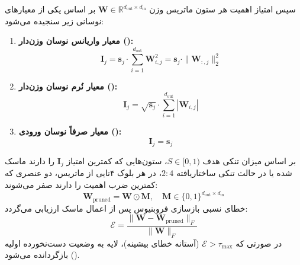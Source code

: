 سپس امتیاز اهمیت هر ستون ماتریس وزن $\mathbf{W} \in \mathbb{R}^{d_{\text{out}} \times d_{\text{in}}}$ بر اساس یکی از معیارهای نوسانی زیر سنجیده می‌شود:
\begin{enumerate}
    \item \textbf{معیار واریانس نوسان وزن‌دار ():}
    \begin{equation}
    \mathbf{I}_j = \mathbf{s}_j \cdot \sum_{i=1}^{d_{\text{out}}} \mathbf{W}_{i, j}^2 = \mathbf{s}_j \cdot \|\mathbf{W}_{:, j}\|_2^2
    \end{equation}
    \item \textbf{معیار نُرم نوسان وزن‌دار ():}
    \begin{equation}
    \mathbf{I}_j = \sqrt{\mathbf{s}_j} \cdot \sum_{i=1}^{d_{\text{out}}} |\mathbf{W}_{i, j}|
    \end{equation}
    \item \textbf{معیار صرفاً نوسان ورودی ():}
    \begin{equation}
    \mathbf{I}_j = \mathbf{s}_j
    \end{equation}
\end{enumerate}

بر اساس میزان تنکی هدف $S \in [0, 1)$، ستون‌هایی که کمترین امتیاز $\mathbf{I}_j$ را دارند ماسک شده یا در حالت تنکی ساختاریافته $2:4$، در هر بلوک ۴تایی از ماتریس، دو عنصری که کمترین ضرب اهمیت را دارند صفر می‌شوند:
\begin{equation}
\mathbf{W}_{\text{pruned}} = \mathbf{W} \odot \mathbf{M}, \quad \mathbf{M} \in \{0, 1\}^{d_{\text{out}} \times d_{\text{in}}}
\end{equation}
خطای نسبی بازسازی فروبنیوس پس از اعمال ماسک ارزیابی می‌گردد:
\begin{equation}
\mathcal{E} = \frac{\|\mathbf{W} - \mathbf{W}_{\text{pruned}}\|_F}{\|\mathbf{W}\|_F}
\end{equation}
در صورتی که $\mathcal{E} > \tau_{\text{max}}$ (آستانه خطای بیشینه)، لایه به وضعیت دست‌نخورده اولیه بازگردانده می‌شود ().

